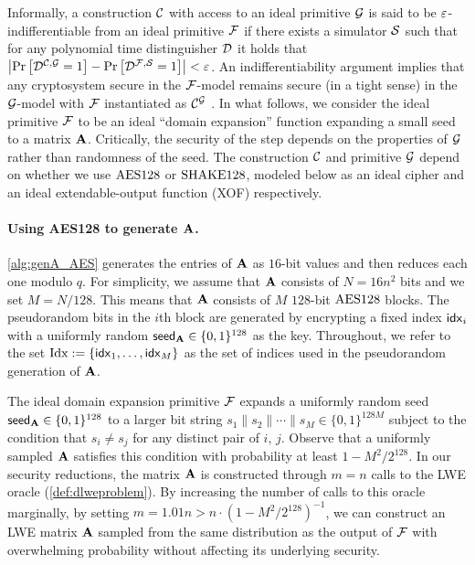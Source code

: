 Informally, a construction $\mathcal{C}$ with
access to an ideal primitive $\mathcal{G}$ is said to be $\varepsilon$-indifferentiable
from an ideal primitive $\mathcal{F}$ if there exists a simulator $\mathcal{S}$ such that
for any polynomial time distinguisher $\mathcal{D}$ it holds that $\left| \Pr\left[
\mathcal{D}^{\mathcal{C}, \mathcal{G}} = 1  \right] - \Pr\left[\mathcal{D}^{\mathcal{F}, \mathcal{S}} = 1
\right] \right|< \varepsilon$. An
indifferentiability argument implies that any cryptosystem secure in the
$\mathcal{F}$-model remains secure (in a tight sense) in the $\mathcal{G}$-model with
$\mathcal{F}$ instantiated as $\mathcal{C}^{\mathcal{G}}$ \cite{TCC:MauRenHol04}. In what follows, we consider the ideal
primitive $\mathcal{F}$ to be an ideal ``domain expansion'' function expanding a small
seed to a matrix $\mathbf{A}$. Critically, the security of the step depends on the properties of $\mathcal{G}$ rather than randomness of the seed. The construction $\mathcal{C}$ and primitive
$\mathcal{G}$ depend on whether we use $\textrm{\upshape\mdseries AES128}$ or $\textrm{\upshape\mdseries SHAKE}128$, modeled below as an ideal cipher and an ideal extendable-output function (XOF) respectively.

\paragraph{Using AES128 to generate $\mathbf{A}$.}
\autoref{alg:genA_AES} generates the entries of $\mathbf{A}$ as $16$-bit values and then reduces each one modulo $q$. For simplicity, we assume that $\mathbf{A}$ consists of  $N=16n^2$ bits 
and we set $M = N/128$. This means that $\mathbf{A}$ consists of $M$ $128$-bit
$\textrm{\upshape\mdseries AES128}$ blocks. The pseudorandom bits in the $i$th block are
generated by encrypting a fixed index $\mathsf{idx}_i$ with a uniformly random ${\mathsf{seed}_{\mathbf{A}}}\in \{0,1\}^{128}$ as the key. Throughout, we refer to the set $\mathrm{Idx} := \left\{\mathsf{idx}_1,\ldots, \mathsf{idx}_M\right\}$ as the set of indices used in the pseudorandom generation of $\mathbf{A}$.

The ideal domain expansion primitive $\mathcal{F}$ expands a uniformly random seed
${\mathsf{seed}_{\mathbf{A}}} \in \{0,1\}^{128}$ to a larger bit string $s_1 \| s_2 \| \cdots \|
s_M \in \{0, 1\}^{128M}$ subject to the condition that $s_i \neq s_j$ for any
distinct pair of $i$, $j$. Observe that a uniformly sampled $\mathbf{A}$ satisfies
this condition with probability at least $1-M^2/2^{128}$. In our security
reductions, the matrix $\mathbf{A}$ is constructed through $m = n$ calls to the LWE
oracle (\autoref{def:dlweproblem}). By increasing the number of calls to this
oracle marginally, by setting $m = 1.01n > n \cdot (1-M^2/2^{128})^{-1}$, we
can construct an LWE matrix $\mathbf{A}$ sampled from the same distribution as the
output of $\mathcal{F}$ with overwhelming probability without affecting its
underlying security.
\medskip

